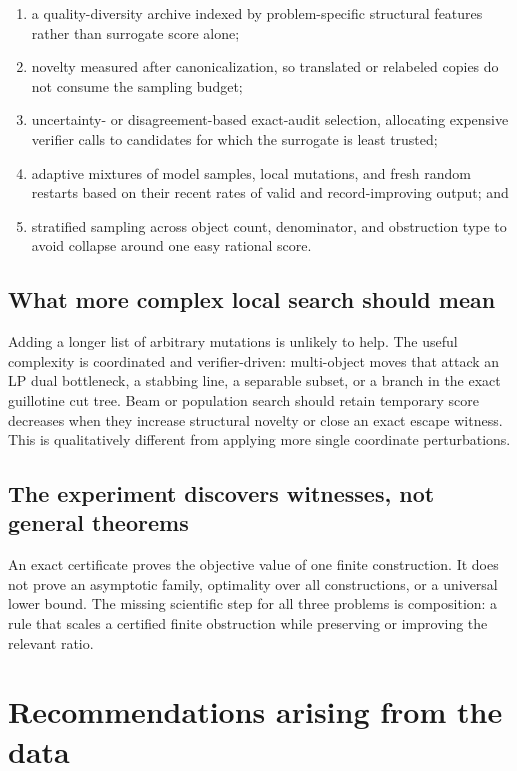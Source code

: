 \documentclass[11pt]{article}
\begin{document}
\begin{enumerate}
\item a quality-diversity archive indexed by problem-specific structural
features rather than surrogate score alone;
\item novelty measured after canonicalization, so translated or relabeled
copies do not consume the sampling budget;
\item uncertainty- or disagreement-based exact-audit selection, allocating
expensive verifier calls to candidates for which the surrogate is least
trusted;
\item adaptive mixtures of model samples, local mutations, and fresh random
restarts based on their recent rates of valid and record-improving output; and
\item stratified sampling across object count, denominator, and obstruction
type to avoid collapse around one easy rational score.
\end{enumerate}

\subsection{What more complex local search should mean}

Adding a longer list of arbitrary mutations is unlikely to help.  The useful
complexity is coordinated and verifier-driven: multi-object moves that attack
an LP dual bottleneck, a stabbing line, a separable subset, or a branch in the
exact guillotine cut tree.  Beam or population search should retain temporary
score decreases when they increase structural novelty or close an exact
escape witness.  This is qualitatively different from applying more single
coordinate perturbations.

\subsection{The experiment discovers witnesses, not general theorems}

An exact certificate proves the objective value of one finite construction.
It does not prove an asymptotic family, optimality over all constructions, or
a universal lower bound.  The missing scientific step for all three problems
is composition: a rule that scales a certified finite obstruction while
preserving or improving the relevant ratio.

\section{Recommendations arising from the data}
\end{document}
